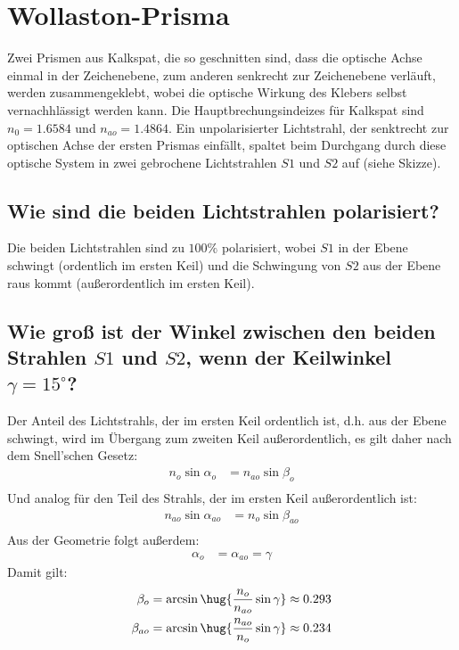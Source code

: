 \documentclass[ex]{exercise}
\begin{document}
\section{Wollaston-Prisma}
Zwei Prismen aus Kalkspat, die so geschnitten sind, dass die optische Achse einmal in der
Zeichenebene, zum anderen senkrecht zur Zeichenebene verläuft, werden zusammengeklebt,
wobei die optische Wirkung des Klebers selbst vernachhlässigt werden kann. 
Die Hauptbrechungsindeizes für Kalkspat sind \(n_0=1.6584\) und \(n_{ao}=1.4864\).
Ein unpolarisierter Lichtstrahl, der senktrecht zur optischen Achse der ersten Prismas einfällt, 
spaltet beim Durchgang durch diese optische System in zwei gebrochene Lichtstrahlen 
\(S1\) und \(S2\) auf (siehe Skizze).

\subsection{Wie sind die beiden Lichtstrahlen polarisiert?}
Die beiden Lichtstrahlen sind zu \(100\%\) polarisiert, wobei \(S1\) in der Ebene schwingt 
(ordentlich im ersten Keil)
und die Schwingung von \(S2\) aus der Ebene raus kommt (au{\ss}erordentlich im ersten Keil).

\subsection{Wie gro{\ss} ist der Winkel zwischen den beiden Strahlen \(S1\) und \(S2\),
wenn der Keilwinkel \(\gamma=15^\circ\)?}

\dottedlinett

Der Anteil des Lichtstrahls, der im ersten Keil ordentlich ist, d.h. 
aus der Ebene schwingt, wird im Übergang zum zweiten Keil au{\ss}erordentlich, es 
gilt daher nach dem Snell'schen Gesetz:
\begin{align*}
    n_o \sin\alpha_o &= n_{ao} \sin\beta_o\\
\end{align*}
Und analog für den Teil des Strahls, der im ersten Keil au{\ss}erordentlich ist:
\begin{align*}
    n_{ao} \sin\alpha_{ao} &= n_{o} \sin\beta_{ao}\\
\end{align*}
Aus der Geometrie folgt au{\ss}erdem:
\begin{align*}
    \alpha_{o}&= 
    \alpha_{ao} = \gamma 
\end{align*}
Damit gilt:
\begin{align*}
    \beta_{o} &= \arcsin\hug{\frac{n_o}{n_{ao}} \sin\gamma}\approx 0.293\\
    \beta_{ao} &= \arcsin\hug{\frac{n_{ao}}{n_o} \sin\gamma}\approx 0.234\\
\end{align*}
\end{document}
